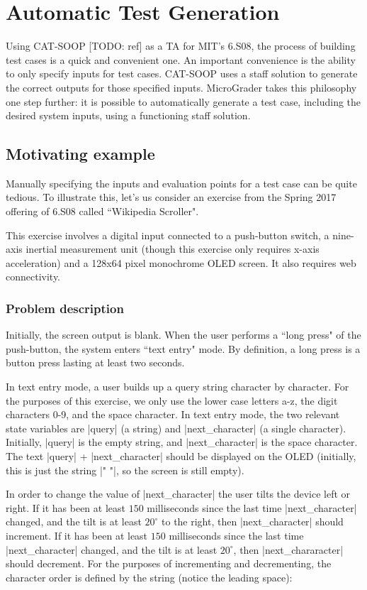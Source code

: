 \documentclass[12pt]{article}
\begin{document}
\newpage
\section{Automatic Test Generation}
\label{sec:scaffold}

Using CAT-SOOP [TODO: ref] as a TA for MIT's 6.S08, the process of building test cases is a quick and convenient one.  An important convenience is the ability to only specify inputs for test cases.  CAT-SOOP uses a staff solution to generate the correct outputs for those specified inputs.  MicroGrader takes this philosophy one step further: it is possible to automatically generate a test case, including the desired system inputs, using a functioning staff solution.

\subsection{Motivating example}
Manually specifying the inputs and evaluation points for a test case can be quite tedious.  To illustrate this, let's us consider an exercise from the Spring 2017 offering of 6.S08 called ``Wikipedia Scroller".

This exercise involves a digital input connected to a push-button switch, a nine-axis inertial measurement unit (though this exercise only requires x-axis acceleration) and a 128x64 pixel monochrome OLED screen.  It also requires web connectivity.

\subsubsection{Problem description}

Initially, the screen output is blank.  When the user performs a ``long press" of the push-button, the system enters ``text entry" mode.  By definition, a long press is a button press lasting at least two seconds.

In text entry mode, a user builds up a query string character by character.  For the purposes of this exercise, we only use the lower case letters a-z, the digit characters 0-9, and the space character.  In text entry mode, the two relevant state variables are |query| (a string) and |next_character| (a single character).  Initially, |query| is the empty string, and |next_character| is the space character.  The text |query| + |next_character| should be displayed on the OLED (initially, this is just the string |" "|, so the screen is still empty).

In order to change the value of |next_character| the user tilts the device left or right.  If it has been at least $150$ milliseconds since the last time |next_character| changed, and the tilt is at least $20^{\circ}$ to the right, then |next_character| should increment.  If it has been at least $150$ milliseconds since the last time |next_character| changed, and the tilt is at least $20^{\circ}$, then |next_chararacter| should decrement.  For the purposes of incrementing and decrementing, the character order is defined by the string (notice the leading space):
\end{document}
